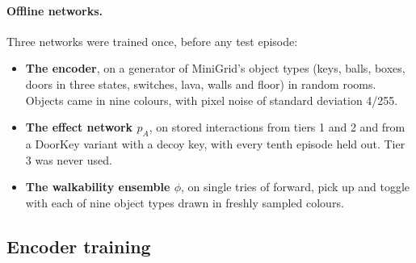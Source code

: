 \documentclass{article}
\begin{document}
\paragraph{Offline networks.} Three networks were trained once, before any test episode:
\begin{itemize}
    \item \textbf{The encoder}, on a generator of MiniGrid's object types (keys, balls, boxes, doors in three states, switches, lava, walls and floor) in random rooms. Objects came in nine colours, with pixel noise of standard deviation 4/255.
    \item \textbf{The effect network $p_A$}, on stored interactions from tiers 1 and 2 and from a DoorKey variant with a decoy key, with every tenth episode held out. Tier 3 was never used.
    \item \textbf{The walkability ensemble $\phi$}, on single tries of forward, pick up and toggle with each of nine object types drawn in freshly sampled colours.
\end{itemize}

\subsection{Encoder training}
\end{document}
